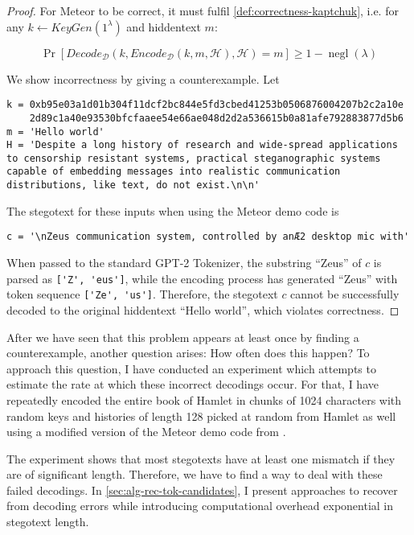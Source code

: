 \begin{proof}
For Meteor to be correct, it must fulfil \autoref{def:correctness-kaptchuk}, i.e. for any $k \leftarrow KeyGen(1^\lambda)$ and hiddentext $m$:

$$\mathop{Pr}[Decode_{\mathcal{D}}(k, Encode_{\mathcal{D}}(k, m, \mathcal{H}), \mathcal{H}) = m] \geq 1 - \mathop{negl}(\lambda)$$

We show incorrectness by giving a counterexample. 
Let

\begin{lstlisting}[breaklines]
k = 0xb95e03a1d01b304f11dcf2bc844e5fd3cbed41253b0506876004207b2c2a10e
    2d89c1a40e93530bfcfaaee54e66ae048d2d2a536615b0a81afe792883877d5b6
m = 'Hello world'
H = 'Despite a long history of research and wide-spread applications to censorship resistant systems, practical steganographic systems capable of embedding messages into realistic communication distributions, like text, do not exist.\n\n'
\end{lstlisting}

The stegotext for these inputs when using the Meteor demo code is

\begin{lstlisting}
c = '\nZeus communication system, controlled by anÆ2 desktop mic with'
\end{lstlisting}

When passed to the standard GPT-2 Tokenizer, the substring ``Zeus'' of $c$ is parsed as \lstinline{['Z', 'eus']}, while the encoding process has generated ``Zeus'' with token sequence \lstinline{['Ze', 'us']}.
Therefore, the stegotext $c$ cannot be successfully decoded to the original hiddentext ``Hello world'', which violates correctness.
\end{proof}

After we have seen that this problem appears at least once by finding a counterexample, another question arises:
How often does this happen?
To approach this question, I have conducted an experiment which attempts to estimate the rate at which these incorrect decodings occur.
For that, I have repeatedly encoded the entire book of Hamlet in chunks of 1024 characters with random keys and histories of length 128 picked at random from Hamlet as well using a modified version of the Meteor demo code from \cite{MeteorDemo2021}.

The experiment shows that most stegotexts have at least one mismatch if they are of significant length.
Therefore, we have to find a way to deal with these failed decodings.
In \autoref{sec:alg-rec-tok-candidates}, I present approaches to recover from decoding errors while introducing computational overhead exponential in stegotext length.

